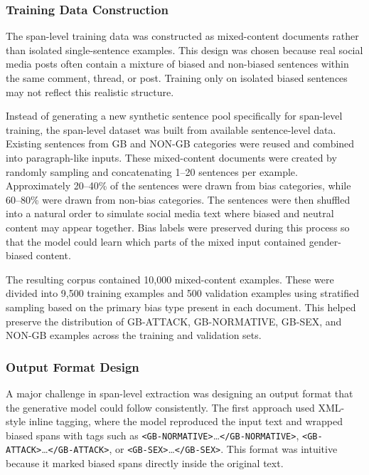 \documentclass[12pt,oneside,openright,a4paper]{cpe-english-project}
\begin{document}
\subsubsection{Training Data Construction}

The span-level training data was constructed as mixed-content documents rather than isolated single-sentence examples. This design was chosen because real social media posts often contain a mixture of biased and non-biased sentences within the same comment, thread, or post. Training only on isolated biased sentences may not reflect this realistic structure.

Instead of generating a new synthetic sentence pool specifically for span-level training, the span-level dataset was built from available sentence-level data. Existing sentences from GB and NON-GB categories were reused and combined into paragraph-like inputs. These mixed-content documents were created by randomly sampling and concatenating 1--20 sentences per example. Approximately 20--40\% of the sentences were drawn from bias categories, while 60--80\% were drawn from non-bias categories. The sentences were then shuffled into a natural order to simulate social media text where biased and neutral content may appear together. Bias labels were preserved during this process so that the model could learn which parts of the mixed input contained gender-biased content.

The resulting corpus contained 10,000 mixed-content examples. These were divided into 9,500 training examples and 500 validation examples using stratified sampling based on the primary bias type present in each document. This helped preserve the distribution of GB-ATTACK, GB-NORMATIVE, GB-SEX, and NON-GB examples across the training and validation sets.

\subsubsection{Output Format Design}

A major challenge in span-level extraction was designing an output format that the generative model could follow consistently. The first approach used XML-style inline tagging, where the model reproduced the input text and wrapped biased spans with tags such as \texttt{<GB-NORMATIVE>}\ldots\texttt{</GB-NORMATIVE>}, \texttt{<GB-ATTACK>}\ldots\texttt{</GB-ATTACK>}, or \texttt{<GB-SEX>}\ldots\texttt{</GB-SEX>}. This format was intuitive because it marked biased spans directly inside the original text.
\end{document}
